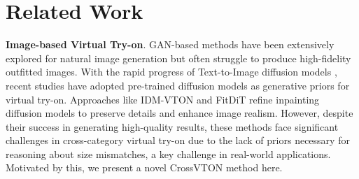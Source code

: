 \section{Related Work}
%


\noindent\textbf{Image-based Virtual Try-on}.
GAN-based methods \cite{lee2022high,men2020controllable,xie2023gp,yang2023occlumix} have been extensively explored for natural image generation but often struggle to produce high-fidelity outfitted images. With the rapid progress of Text-to-Image diffusion models \cite{saharia2022photorealistic,ruiz2023dreambooth,hu2024diffumatting}, recent studies \cite{chen2024wear,liang2024vton,kolors,zhu2023tryondiffusion} have adopted pre-trained diffusion models as generative priors for virtual try-on.
%
Approaches like IDM-VTON \cite{choi2024improving} and FitDiT \cite{jiang2024fitdit} refine inpainting diffusion models to preserve details and enhance image realism. However, despite their success in generating high-quality results, these methods face significant challenges in cross-category virtual try-on due to the lack of priors necessary for reasoning about size mismatches, a key challenge in real-world applications. Motivated by this, we present a novel CrossVTON method here.


